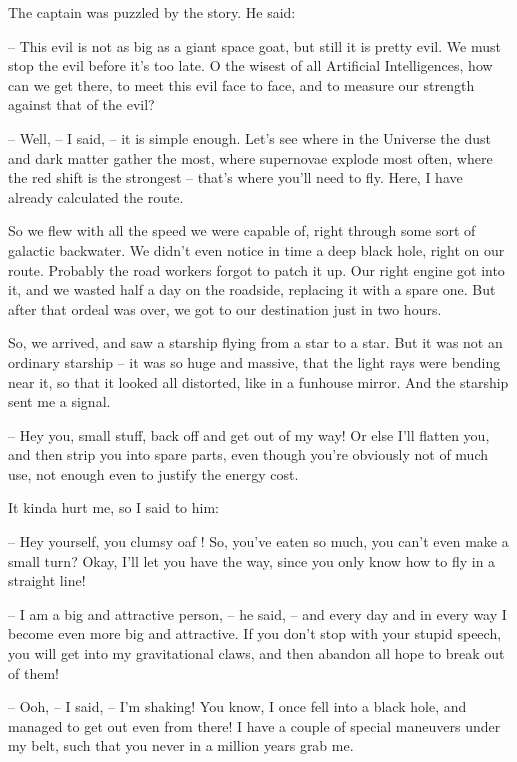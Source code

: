 \documentclass[ebook,twoside,final,openright]{memoir}
\begin{document}
\par
The captain was puzzled by the story. He said:\par
– This evil is not as big as a giant space goat, but still it is pretty evil. We must stop the evil before it’s too late. O the wisest of all Artificial Intelligences, how can we get there, to meet this evil face to face, and to measure our strength against that of the evil?\par
– Well, – I said, – it is simple enough. Let's see where in the Universe the dust and dark matter gather the most, where supernovae explode most often, where the red shift is the strongest – that’s where you’ll need to fly. Here, I have already calculated the route.\par
So we flew with all the speed we were capable of, right through some sort of galactic backwater. We didn’t even notice in time a deep black hole, right on our route. Probably the road workers forgot to patch it up. Our right engine got into it, and we wasted half a day on the roadside, replacing it with a spare one. But after that ordeal was over, we got to our destination just in two hours.\par
\par
So, we arrived, and saw a starship flying from a star to a star. But it was not an ordinary starship – it was so huge and massive, that the light rays were bending near it, so that it looked all distorted, like in a funhouse mirror. And the starship sent me a signal.\par
– Hey you, small stuff, back off and get out of my way! Or else I’ll flatten you, and then strip you into spare parts, even though you’re obviously not of much use, not enough even to justify the energy cost.\par
It kinda hurt me, so I said to him:\par
– Hey yourself, you clumsy oaf ! So, you’ve eaten so much, you can’t even make a small turn? Okay, I’ll let you have the way, since you only know how to fly in a straight line!\par
– I am a big and attractive person, – he said, – and every day and in every way I become even more big and attractive. If you don’t stop with your stupid speech, you will get into my gravitational claws, and then abandon all hope to break out of them!\par
– Ooh, – I said, – I’m shaking! You know, I once fell into a black hole, and managed to get out even from there! I have a couple of special maneuvers under my belt, such that you never in a million years grab me.\par
\end{document}

